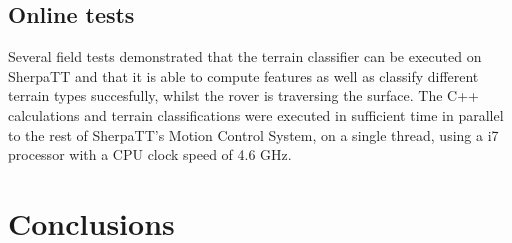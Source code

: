 \documentclass{article}
\begin{document}
\subsection{Online tests}
Several field tests demonstrated that the terrain classifier can be executed on SherpaTT and that it is able to compute features as well as classify different terrain types succesfully, whilst the rover is traversing the surface. The C++ calculations and terrain classifications were executed in sufficient time in parallel to the rest of SherpaTT's Motion Control System, on a single thread, using a i7 processor with a CPU clock speed of 4.6 GHz. 


\section{Conclusions}


\FloatBarrier



\end{document}
